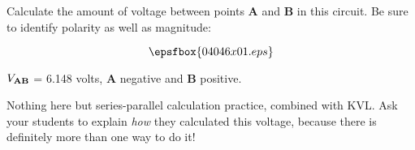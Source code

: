

Calculate the amount of voltage between points {\bf A} and {\bf B} in this circuit.  Be sure to identify polarity as well as magnitude:

$$\epsfbox{04046x01.eps}$$







$V_{\bf AB}$ = 6.148 volts, {\bf A} negative and {\bf B} positive.







Nothing here but series-parallel calculation practice, combined with KVL.  Ask your students to explain {\it how} they calculated this voltage, because there is definitely more than one way to do it!




